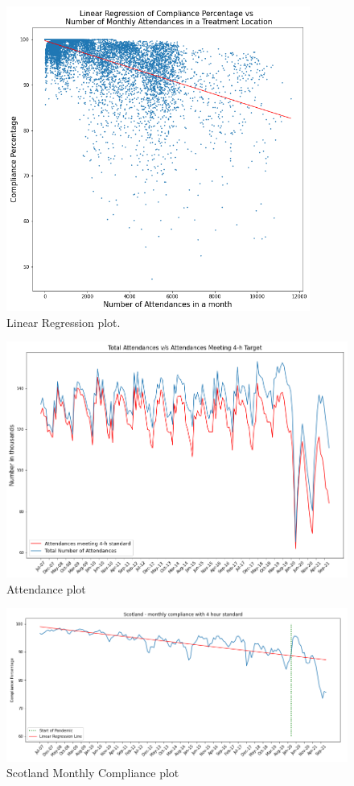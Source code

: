 \documentclass[11pt,a4paper]{article}
\begin{document}
\begin{figure}[h]
  \centering
  \includegraphics[width=0.8\linewidth,height = 100mm]{regression_attendances_compliance.png}
  \caption{Linear Regression plot.}
\end{figure}


\begin{figure}[h]
  \centering
  \includegraphics[width=0.8\linewidth]{total_meeting_target.png}
  \caption{Attendance plot}
\end{figure}

\begin{figure}[h]
  \includegraphics[width=\linewidth]{monthly_compliance_with_4_hour_standard.png}
  \caption{Scotland Monthly Compliance plot}
\end{figure}
\end{document}
